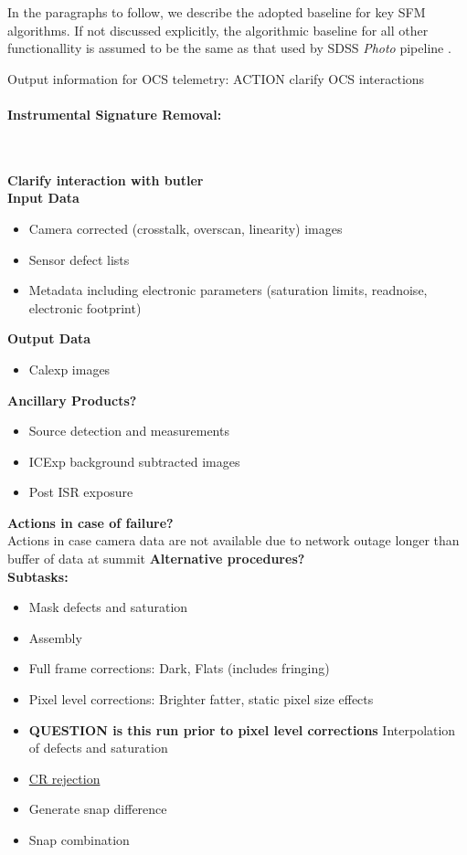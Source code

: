 In the paragraphs to follow, we describe the adopted baseline for key SFM algorithms. If not discussed explicitly, the algorithmic baseline for all other functionallity is assumed to be the same as that used by SDSS \emph{Photo} pipeline \cite{LuptonPhoto}.

Output information for OCS telemetry: ACTION clarify OCS interactions

\paragraph{Instrumental Signature Removal:}~

\noindent
{\bf Clarify interaction with butler}\\

{\bf Input Data}\\
\begin{itemize}
\item Camera corrected (crosstalk, overscan, linearity) images
\item Sensor defect lists
\item Metadata including electronic parameters (saturation limits, readnoise, electronic
  footprint)
\end{itemize}

\noindent
{\bf Output Data}\\
\begin{itemize}
\item Calexp images
\end{itemize}

{\bf Ancillary Products?}\\
\begin{itemize}
\item Source detection and measurements
\item ICExp background subtracted images
\item Post ISR exposure
\end{itemize}

{\bf Actions in case of failure?}\\
Actions in case camera data are not available due to network outage
longer than buffer of data at summit
{\bf Alternative procedures?}\\

\noindent
{\bf Subtasks:}
\begin{itemize}
\item Mask defects and saturation
\item Assembly
\item Full frame corrections: Dark, Flats (includes fringing)
\item Pixel level corrections: Brighter fatter, static pixel size effects
\item {\bf QUESTION is this run prior to pixel level corrections} Interpolation of defects and saturation
\item \hyperref[sec:artifact]{CR rejection}
\item Generate snap difference
\item Snap combination
\end{itemize}


